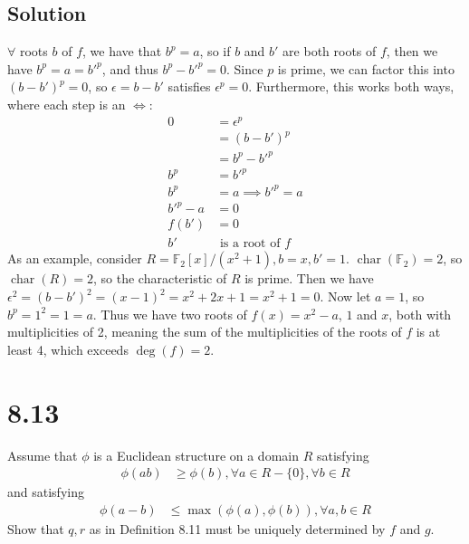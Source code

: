 \documentclass[fleqn]{article}
\DeclareMathOperator{\Char}{char}
\begin{document}
        \subsection{Solution}
        $\forall$ roots $b$ of $f$, we have that $b^p = a$, so if $b$ and $b'$ are both roots of $f$, then we have $b^p = a = b'^p$, and thus $b^p - b'^p = 0$.  Since $p$ is prime, we can factor this into $(b - b')^p = 0$, so $\epsilon = b - b'$ satisfies $\epsilon^p = 0$.  Furthermore, this works both ways, where each step is an $\iff$:
        \begin{align}
            0 &= \epsilon^p \\
                &= (b - b')^p \\
                &= b^p - b'^p \\
            b^p &= b'^p \\
            b^p &= a \implies b'^p = a \\
            b'^p - a &= 0 \\
            f(b') &= 0 \\
            b' & \text{ is a root of } f
        \end{align}
        As an example, consider $R = \mathbb{F}_2[x]/(x^2 + 1), b = x, b' = 1$.  $\Char(\mathbb{F}_2) = 2$, so $\Char(R) = 2$, so the characteristic of $R$ is prime.  Then we have $\epsilon^2 = (b - b')^2 = (x - 1)^2 = x^2 + 2x + 1 = x^2 + 1 = 0$.  Now let $a = 1$, so $b^p = 1^2 = 1 = a$.  Thus we have two roots of $f(x) = x^2 - a$, $1$ and $x$, both with multiplicities of 2, meaning the sum of the multiplicities of the roots of $f$ is at least 4, which exceeds $\deg(f) = 2$.
    
    \section{8.13}
    Assume that $\phi$ is a Euclidean structure on a domain $R$ satisfying
    \begin{align}
        \phi(ab) &\geq \phi(b), \forall a \in R - \{0\}, \forall b \in R
    \end{align}
    and satisfying
    \begin{align}
        \phi(a - b) &\leq \max(\phi(a), \phi(b)), \forall a, b \in R
    \end{align}
    Show that $q, r$ as in Definition 8.11 must be uniquely determined by $f$ and $g$.
        
\end{document}
